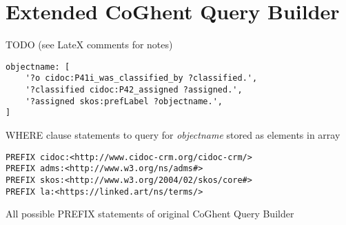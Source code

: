 \chapter{Extended CoGhent Query Builder}
\label{chap:coghent_query_builder}

TODO (see LateX comments for notes)


%
\begin{listing}[htbp]
    \begin{verbatim}
objectname: [
    '?o cidoc:P41i_was_classified_by ?classified.',
    '?classified cidoc:P42_assigned ?assigned.',
    '?assigned skos:prefLabel ?objectname.',
]
    \end{verbatim}
    \caption{WHERE clause statements to query for \textit{objectname} stored as elements in array}
    \label{lst:where_statements_array}
\end{listing}
%
\begin{listing}[htbp]
    \begin{verbatim}
PREFIX cidoc:<http://www.cidoc-crm.org/cidoc-crm/>
PREFIX adms:<http://www.w3.org/ns/adms#>
PREFIX skos:<http://www.w3.org/2004/02/skos/core#>
PREFIX la:<https://linked.art/ns/terms/>
    \end{verbatim}
    \caption{All possible PREFIX statements of original CoGhent Query Builder}
    \label{lst:prefix_statements_original}
\end{listing}
%



